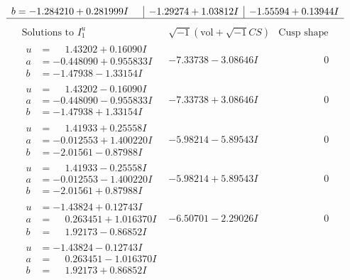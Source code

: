 \documentclass[1p]{elsarticle_modified}
\theoremstyle{definition}
\newcommand{\I}{\sqrt{-1}}
\begin{document}
$$\begin{array}{c|c|c}
\begin{aligned}
b &= -1.284210 + 0.281999 I\end{aligned}
 & -1.29274 + 1.03812 I & -1.55594 + 0.13944 I\\
 \hline 
 \end{array}$$\newpage$$\begin{array}{c|c|c}  
\text{Solutions to }I^u_{1}& \I (\text{vol} + \sqrt{-1}CS) & \text{Cusp shape}\\
 \hline 
\begin{aligned}
u &= \phantom{-}1.43202 + 0.16090 I \\
a &= -0.448090 + 0.955833 I \\
b &= -1.47938 - 1.33154 I\end{aligned}
 & -7.33738 - 3.08646 I & \phantom{-0.000000 } 0 \\ \hline\begin{aligned}
u &= \phantom{-}1.43202 - 0.16090 I \\
a &= -0.448090 - 0.955833 I \\
b &= -1.47938 + 1.33154 I\end{aligned}
 & -7.33738 + 3.08646 I & \phantom{-0.000000 } 0 \\ \hline\begin{aligned}
u &= \phantom{-}1.41933 + 0.25558 I \\
a &= -0.012553 + 1.400220 I \\
b &= -2.01561 - 0.87988 I\end{aligned}
 & -5.98214 - 5.89543 I & \phantom{-0.000000 } 0 \\ \hline\begin{aligned}
u &= \phantom{-}1.41933 - 0.25558 I \\
a &= -0.012553 - 1.400220 I \\
b &= -2.01561 + 0.87988 I\end{aligned}
 & -5.98214 + 5.89543 I & \phantom{-0.000000 } 0 \\ \hline\begin{aligned}
u &= -1.43824 + 0.12743 I \\
a &= \phantom{-}0.263451 + 1.016370 I \\
b &= \phantom{-}1.92173 - 0.86852 I\end{aligned}
 & -6.50701 - 2.29026 I & \phantom{-0.000000 } 0 \\ \hline\begin{aligned}
u &= -1.43824 - 0.12743 I \\
a &= \phantom{-}0.263451 - 1.016370 I \\
b &= \phantom{-}1.92173 + 0.86852 I\end{aligned}

\end{array}$$
\end{document}
